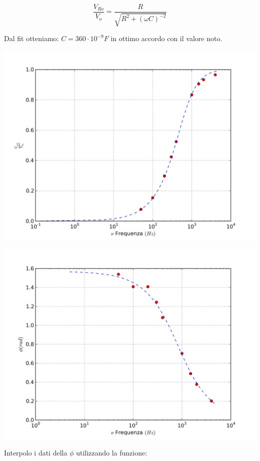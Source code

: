 $$\frac{V_{Ro}}{V_o} = \frac{R}{\sqrt{R^2+(\omega C)^{-2}}}$$

Dal fit otteniamo: $C=360 \cdot 10^{-9} F $ in ottimo accordo con il valore noto.

\begin{center}
 \includegraphics[scale=0.70]{grafici/C3/ddpcond.png}
\end{center}

\begin{center}
 \includegraphics[scale=0.70]{grafici/C3/fasecap.png}
\end{center}



Interpolo i dati della $ \phi$ utilizzando la funzione:

